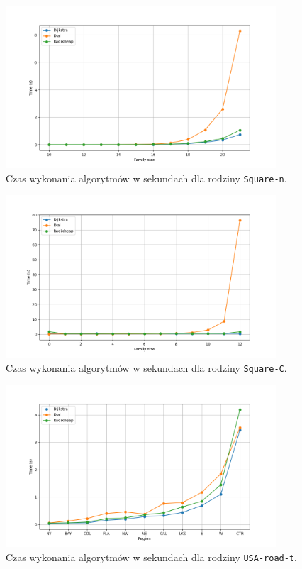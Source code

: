 \documentclass{article}
\begin{document}
\begin{figure}[H]
    \centering
    \includegraphics[width=0.9\textwidth]{Square-n.png}
    \caption{Czas wykonania algorytmów w sekundach dla rodziny \texttt{Square-n}.}
\end{figure}

\begin{figure}[H]
    \centering
    \includegraphics[width=0.9\textwidth]{Square-C.png}
    \caption{Czas wykonania algorytmów w sekundach dla rodziny \texttt{Square-C}.}
\end{figure}

\begin{figure}[H]
    \centering
    \includegraphics[width=0.9\textwidth]{USA-road-t.png}
    \caption{Czas wykonania algorytmów w sekundach dla rodziny \texttt{USA-road-t}.}
\end{figure}
\end{document}
